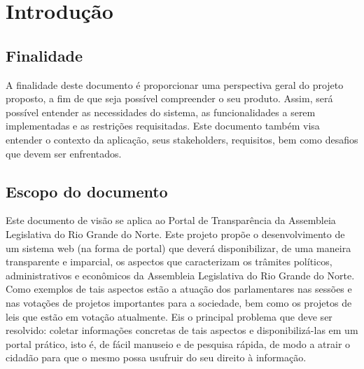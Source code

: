 \documentclass[12pt, a4paper]{article}
\begin{document}
    \section{Introdução}
        \subsection{Finalidade}
        A finalidade deste documento é proporcionar uma perspectiva geral do
        projeto proposto, a fim de que seja possível compreender o seu produto.
        Assim, será possível entender as necessidades do sistema, as
        funcionalidades a serem implementadas e as restrições requisitadas.
        Este documento também visa entender o contexto da aplicação, seus
        stakeholders, requisitos, bem como desafios que devem ser enfrentados.

        \subsection{Escopo do documento}
        Este documento de visão se aplica ao Portal de Transparência da
        Assembleia Legislativa do Rio Grande do Norte. Este projeto propõe
        o desenvolvimento de um sistema web (na forma de portal) que deverá
        disponibilizar, de uma maneira transparente e imparcial, os aspectos
        que caracterizam os trâmites políticos, administrativos e econômicos da
        Assembleia Legislativa do Rio Grande do Norte.  Como exemplos de tais
        aspectos estão a atuação dos parlamentares nas sessões e nas votações
        de projetos importantes para a sociedade, bem como os projetos de leis
        que estão em votação atualmente. Eis o principal problema que deve ser
        resolvido: coletar informações concretas de tais aspectos e
        disponibilizá-las em um portal prático, isto é, de fácil manuseio e de
        pesquisa rápida, de modo a atrair o cidadão para que o mesmo possa
        usufruir do seu direito à informação.
\end{document}
